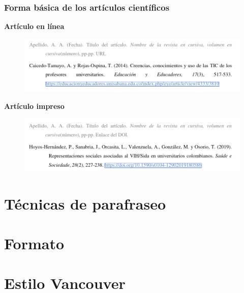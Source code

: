 \documentclass[
11pt, %
]{beamer}
\begin{document}
\begin{frame}
	\frametitle{Forma básica de los artículos científicos}

	\textbf{Artículo en línea}

	\begin{exampleblock}{}
		\begin{figure}
			\centering
			\includegraphics[width=1\linewidth]{images/screenshot016}
			\label{fig:screenshot010}
		\end{figure}
	\end{exampleblock}

	\textbf{Artículo impreso}

	\begin{exampleblock}{}
		\begin{figure}
			\centering
			\includegraphics[width=1\linewidth]{images/screenshot017}
			\label{fig:screenshot010}
		\end{figure}
	\end{exampleblock}

\end{frame}



\section{Técnicas de parafraseo}

\section{Formato}

\section{Estilo Vancouver}
\end{document}
